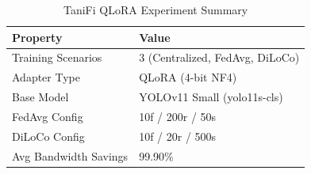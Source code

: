 \documentclass{article}
\begin{document}

\begin{table}[h]
\centering
\caption{TaniFi QLoRA Experiment Summary}
\label{tab:experiment_summary}
\begin{tabular}{ll}
\toprule
Property & Value \\
\midrule
Training Scenarios & 3 (Centralized, FedAvg, DiLoCo) \\
Adapter Type & QLoRA (4-bit NF4) \\
Base Model & YOLOv11 Small (yolo11s-cls) \\
FedAvg Config & 10f / 200r / 50s \\
DiLoCo Config & 10f / 20r / 500s \\
Avg Bandwidth Savings & 99.90\% \\
\bottomrule
\end{tabular}
\end{table}

\end{document}
